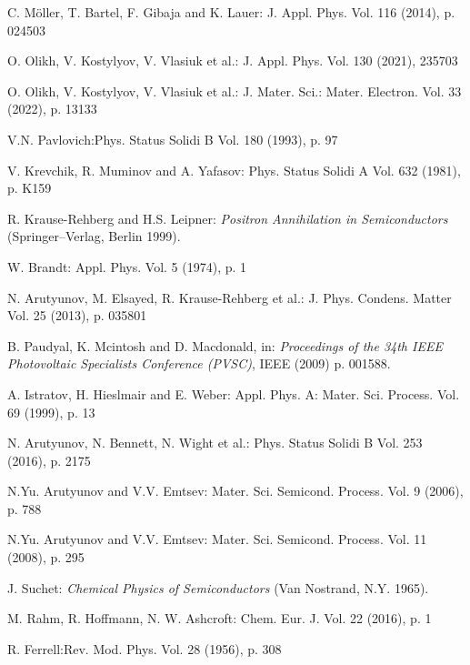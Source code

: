 \documentclass{ttp}
\begin{document}
\begin{thebibliography}{99}

 C. M\"{o}ller, T. Bartel, F. Gibaja and K. Lauer: J. Appl. Phys. Vol. 116 (2014), p. 024503

 O. Olikh, V. Kostylyov, V. Vlasiuk et al.: J. Appl. Phys. Vol. 130 (2021), 235703

 O. Olikh, V. Kostylyov, V. Vlasiuk et al.: J. Mater. Sci.: Mater. Electron. Vol. 33 (2022), p. 13133

 V.N. Pavlovich:Phys. Status Solidi B Vol. 180 (1993), p. 97

  V. Krevchik, R. Muminov and A. Yafasov: Phys. Status Solidi A Vol. 632 (1981), p. K159

 R. Krause-Rehberg and H.S. Leipner: \textit{Positron Annihilation in Semiconductors }(Springer–Verlag, Berlin 1999).

W. Brandt: Appl. Phys. Vol. 5 (1974), p. 1

 N. Arutyunov, M. Elsayed, R. Krause-Rehberg et al.: J. Phys. Condens. Matter Vol. 25 (2013), p. 035801

 B. Paudyal, K. Mcintosh and D. Macdonald, in: \textit{Proceedings of the 34th
IEEE Photovoltaic Specialists Conference (PVSC)}, IEEE (2009) p. 001588.

 A. Istratov, H. Hieslmair and E. Weber: Appl. Phys. A: Mater. Sci. Process. Vol. 69 (1999), p. 13

  N. Arutyunov, N. Bennett, N. Wight et al.: Phys. Status Solidi B Vol. 253 (2016), p. 2175

 N.Yu. Arutyunov and V.V. Emtsev: Mater. Sci. Semicond. Process. Vol. 9 (2006), p. 788

 N.Yu. Arutyunov and V.V. Emtsev: Mater. Sci. Semicond. Process. Vol. 11 (2008), p. 295

 J. Suchet: \textit{Chemical Physics of Semiconductors }(Van Nostrand, N.Y. 1965).

 M. Rahm, R. Hoffmann, N. W. Ashcroft: Chem. Eur. J. Vol. 22 (2016), p. 1

 R. Ferrell:Rev. Mod. Phys. Vol. 28 (1956), p. 308

\end{thebibliography}
\end{document}
